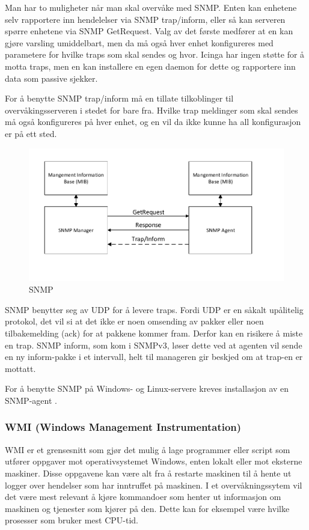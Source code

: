 Man har to muligheter når man skal overvåke med SNMP. Enten kan enhetene selv rapportere inn hendelelser via SNMP trap/inform, eller så kan serveren spørre enhetene via SNMP GetRequest. Valg av det første medfører at en kan gjøre varsling umiddelbart, men da må også hver enhet konfigureres med parametere for hvilke traps som skal sendes og hvor. Icinga har ingen støtte for å motta traps, men en kan installere en egen daemon for dette og rapportere inn data som passive sjekker. 

For å benytte SNMP trap/inform må en tillate tilkoblinger til overvåkingsserveren i stedet for bare fra. Hvilke trap meldinger som skal sendes må også konfigureres på hver enhet, og en vil da ikke kunne ha all konfigurasjon er på ett sted.


\begin{figure}
    \centering
    \includegraphics{img/SNMP}
    \caption{SNMP}
    \label{SNMP}
\end{figure}


SNMP benytter seg av UDP for å levere traps. Fordi UDP er en såkalt upålitelig protokol, det vil si at det ikke er noen omsending av pakker eller noen tilbakemelding (ack) for at pakkene kommer fram. Derfor kan en risikere å miste en trap. SNMP inform, som kom i SNMPv3, løser dette ved at agenten vil sende en ny inform-pakke i et intervall, helt til manageren gir beskjed om at trap-en er mottatt.


For å benytte SNMP på Windows- og Linux-servere kreves installasjon av en SNMP-agent \cite{mssnmp} \cite{netsnmp}.

\subsubsection{WMI (Windows Management Instrumentation)}
WMI er et grensesnitt som gjør det mulig å lage programmer eller script som utfører oppgaver mot operativsystemet Windows, enten lokalt eller mot eksterne maskiner. Disse oppgavene kan være alt fra å restarte maskinen til å hente ut logger over hendelser som har inntruffet på maskinen. I et overvåkningssytem vil det være mest relevant å kjøre kommandoer som henter ut informasjon om maskinen og tjenester som kjører på den. Dette kan for eksempel være hvilke prosesser som bruker mest CPU-tid.

